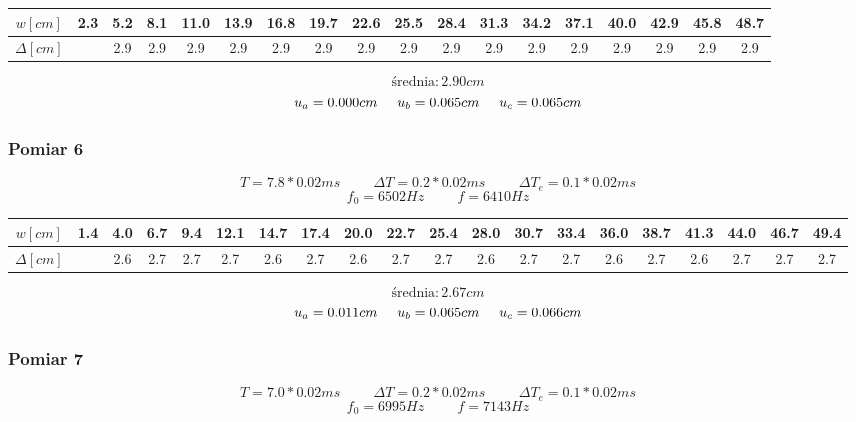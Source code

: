 \documentclass[12pt,a4paper]{article}
\begin{document}
\begin{adjustbox}{max width=1.2\textwidth}
\begin{tabular}{|c|ccccccccccccccccc|}
\hline 
$w[cm]$ &  2.3 & 5.2&  8.1 &11.0& 13.9& 16.8& 19.7& 22.6& 25.5& 28.4 &31.3& 34.2& 37.1& 40.0& 42.9 &45.8& 48.7 \\ 
\hline 
$\Delta[cm]$ & & 2.9 &2.9& 2.9 &2.9& 2.9& 2.9& 2.9 &2.9& 2.9& 2.9& 2.9& 2.9 &2.9& 2.9& 2.9& 2.9 \\ 
\hline 
\end{tabular} 
\end{adjustbox}

$$\text{średnia}: 2.90cm$$
$$u_a = 0.000cm \hspace{0.5cm} u_b = 0.065cm \hspace{0.5cm} u_c = 0.065cm $$

\subsubsection{Pomiar 6}
$$
T = 7.8*0.02ms \hspace{1cm} \Delta T = 0.2*0.02ms \hspace{1cm} \Delta T_e = 0.1*0.02ms 
$$
$$
f_0 = 6502 Hz \hspace{1cm} f=6410Hz
$$

\begin{adjustbox}{max width=1.2\textwidth}
\begin{tabular}{|c|ccccccccccccccccccc|}
\hline 
$w[cm]$ & 1.4 & 4.0 & 6.7 &9.4 &12.1& 14.7 &17.4 &20.0& 22.7 &25.4 &28.0& 30.7& 33.4 &36.0& 38.7& 41.3& 44.0& 46.7& 49.4\\ 
\hline 
$\Delta[cm]$ & & 2.6& 2.7& 2.7& 2.7& 2.6 &2.7 &2.6 &2.7 &2.7 &2.6 &2.7& 2.7& 2.6& 2.7& 2.6& 2.7& 2.7& 2.7 \\ 
\hline 
\end{tabular} 
\end{adjustbox}

$$\text{średnia}: 2.67cm$$
$$u_a = 0.011cm \hspace{0.5cm} u_b = 0.065cm \hspace{0.5cm} u_c = 0.066cm $$

\subsubsection{Pomiar 7}
$$
T = 7.0*0.02ms \hspace{1cm} \Delta T = 0.2*0.02ms \hspace{1cm} \Delta T_e = 0.1*0.02ms 
$$
$$
f_0 = 6995 Hz \hspace{1cm} f=7143Hz
$$
\end{document}

